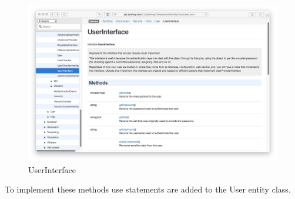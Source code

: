 \begin{figure}[htbp]
   \centering
   \includegraphics[width=400pt]{figures/user_interface.png} %
   \caption{UserInterface}
   \label{fig:UserInterface}
\end{figure}

To implement these methods use statements are added to the User entity class.




















